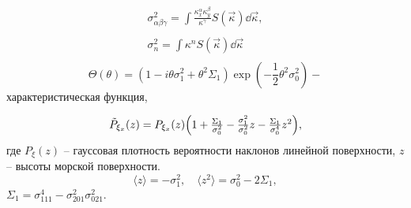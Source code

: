 \documentclass[10pt,pdf,hyperref={unicode}, dvipsnames]{beamer}
\newcommand{\mean}[1]{\langle#1\rangle}
\begin{document}
\begin{frame}[t]
\begin{figure}[h]
    \end{figure}    
    \begin{minipage}{0.45\linewidth}
        \footnotesize
        \begin{equation}
            \textstyle 
            \begin{gathered} \sigma^2_{\alpha \beta \gamma} =
                \int\limits_{} \frac{\kappa_x^\alpha
                \kappa_y^\beta}{\kappa^{\gamma}} S(\vec \kappa) \dd \vec
                \kappa,\\ \sigma_n^2 = \int\limits_{}^{} \kappa^n S(\vec
                \kappa) \dd \vec \kappa 
            \end{gathered}
        \end{equation}
        \begin{equation}
            \label{eq:char}
            \Theta(\theta) = (1 - i \theta \sigma_1^2 + \theta^2 \Sigma_1)
            \exp(-\frac{1}{2} \theta^2 \sigma_0^2)-
        \end{equation}
        характеристическая функция,
        \end{minipage}
    \hfill
    \begin{minipage}{0.45\linewidth}
        \footnotesize
        \begin{equation}
        \textstyle 
            \tilde P_{\xi_x}(z) = 
            P_{\xi_x}(z)\qty(1 + 
                            \frac{\Sigma_1}{\sigma_0^2} -
                            \frac{\sigma_1^2}{\sigma_0^2} z -
                            \frac{\Sigma_1}{\sigma_0^4}z^2), 
        \end{equation}
        где $P_\xi(z)$ -- гауссовая плотность вероятности наклонов линейной
    поверхности,  $z$ -- высоты морской поверхности.
        \begin{equation}
            \mean{z} = - \sigma_1^2, \quad \mean{z^2} = \sigma_0^2 - 2
            \Sigma_1,
        \end{equation}
        $\Sigma_1 = \sigma^4_{111} - \sigma_{201}^2 \sigma_{021}^2$.
    \end{minipage}
\end{frame}
\end{document}
